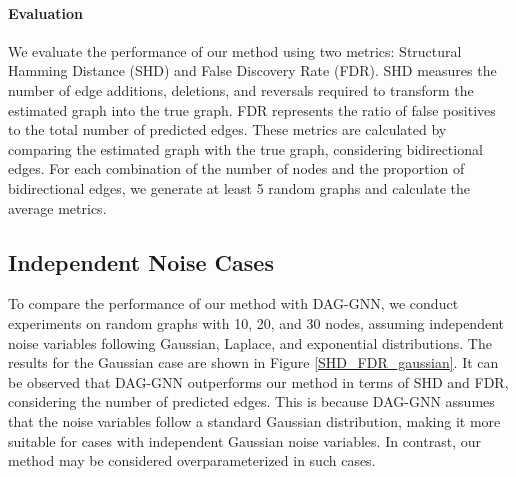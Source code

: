 \documentclass[10pt]{article}
\begin{document}
\paragraph*{Evaluation} We evaluate the performance of our method using two metrics: Structural Hamming Distance (SHD) and False Discovery Rate (FDR). SHD measures the number of edge additions, deletions, and reversals required to transform the estimated graph into the true graph. FDR represents the ratio of false positives to the total number of predicted edges. These metrics are calculated by comparing the estimated graph with the true graph, considering bidirectional edges. For each combination of the number of nodes and the proportion of bidirectional edges, we generate at least 5 random graphs and calculate the average metrics.

\subsection{Independent Noise Cases}

To compare the performance of our method with DAG-GNN, we conduct experiments on random graphs with 10, 20, and 30 nodes, assuming independent noise variables following Gaussian, Laplace, and exponential distributions. The results for the Gaussian case are shown in Figure \ref*{SHD_FDR_gaussian}. It can be observed that DAG-GNN outperforms our method in terms of SHD and FDR, considering the number of predicted edges. This is because DAG-GNN assumes that the noise variables follow a standard Gaussian distribution, making it more suitable for cases with independent Gaussian noise variables. In contrast, our method may be considered overparameterized in such cases.\\
\end{document}
